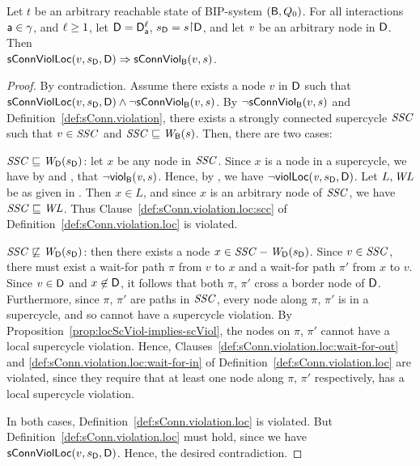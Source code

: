 \begin{proposition}
\label{prop:locConnViol-implies-ConnViol}
 \label{prop:locConnViol-implies-connViol}
Let $t$ be an arbitrary reachable state of BIP-system $(\B, Q_0)$.
For all interactions $\act \in \gamma$, and $\l \ge 1$, let $\DS = \dsks{\act}{\l}$, $\sD = s \pj \dsk{\act}{\l}$, and let $\ndv$ be an arbitrary node in $\dsk{\act}{\l}$.
Then\\
\ind $\locConnViol{v}{\sD}{\act}{\l} \imp \connViol{v}{s}$.
\end{proposition}
%
\begin{proof}
By contradiction. Assume there exists a node $v$ in $\dsk{a}{\l}$ such that $\locConnViol{v}{\sD}{\act}{\l} \land \neg \connViol{v}{s}$.
By $\neg \connViol{v}{s}$ and Definition~\ref{def:sConn.violation}, there exists a strongly connected
supercycle $\SSC$ such that $v \in \SSC$ and $\SSC \subg \wfg{\B}{s}$. Then, there are two cases:
%
\bn
\item $\SSC \subg \wfg{\dsk{a}{\l}}{\sD}$: let $x$ be any node in $\SSC$. Since $x$ is a node in a supercycle, we have by
   and , that $\neg \scV{\ndv}{s}$. 
   Hence, by ,  we have $\neg \scVL{\ndv}{\sD}{\act}{\l}$. 
   Let $L, \WL$ be as given in .
  Then $x \in L$, and since $x$ is an arbitrary node of $\SSC$, we have $\SSC \subg \WL$. 
  Thus Clause~\ref{def:sConn.violation.loc:scc} of Definition~\ref{def:sConn.violation.loc} is violated.

\item $\SSC \not\subg \wfg{\dsk{a}{\l}}{\sD}$: then there exists a node $x \in \SSC - \wfg{\dsk{a}{\l}}{\sD}$.
  Since $v \in \SSC$, there must exist a wait-for path $\pi$
  from $v$ to $x$ and a wait-for path $\pi'$ from $x$ to
  $v$. Since $v \in \dsk{a}{\l}$ and $x \not\in \dsk{a}{\l}$, it
  follows that both $\pi$, $\pi'$  cross a border node of
  $\dsk{a}{\l}$. Furthermore, since $\pi$, $\pi'$ are paths in $\SSC$, every node
  along $\pi$, $\pi'$ is in a supercycle, and so cannot have a supercycle violation.
  By Proposition~\ref{prop:locScViol-implies-scViol}, the nodes on
  $\pi$, $\pi'$  cannot have a local supercycle violation.
  Hence, Clauses~\ref{def:sConn.violation.loc:wait-for-out} and
  \ref{def:sConn.violation.loc:wait-for-in} of Definition~\ref{def:sConn.violation.loc} are violated,
  since they require that at least one node along $\pi$, $\pi'$ respectively, has a local supercycle violation.
  
\en
In both cases,  Definition~\ref{def:sConn.violation.loc} is violated. 
But  Definition~\ref{def:sConn.violation.loc} must hold, since we have $\locConnViol{v}{\sD}{\act}{\l}$. 
Hence, the desired contradiction.
\end{proof}



